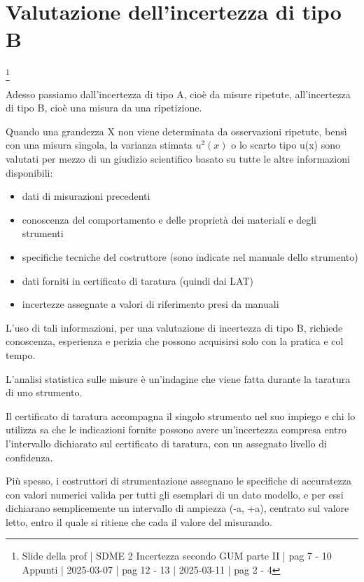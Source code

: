 \newpage

\section{Valutazione dell'incertezza di tipo B}
\footnote{Slide della prof | SDME 2 Incertezza secondo GUM parte II | pag 7 - 10 \\  
Appunti | 2025-03-07 | pag 12 - 13 | 2025-03-11 | pag 2 - 4}

Adesso passiamo dall'incertezza di tipo A, cioè da misure ripetute, 
all'incertezza di tipo B, cioè una misura da una ripetizione. \newline 

Quando una grandezza X non viene determinata da osservazioni ripetute, 
bensì con una misura singola, 
la varianza stimata $u^{2} (x)$ o lo scarto tipo u(x) sono valutati per mezzo 
di un giudizio scientifico basato su tutte le altre informazioni disponibili: 

\begin{itemize}
    \item dati di misurazioni precedenti 
    \item conoscenza del comportamento e delle proprietà dei materiali e degli strumenti 
    \item specifiche tecniche del costruttore (sono indicate nel manuale dello strumento)
    \item dati forniti in certificato di taratura (quindi dai LAT) 
    \item incertezze assegnate a valori di riferimento presi da manuali 
\end{itemize}

L'uso di tali informazioni, per una valutazione di incertezza di tipo B, 
richiede conoscenza, esperienza e perizia che possono acquisirsi solo con la pratica e col tempo. \newline 

L'analisi statistica sulle misure è un'indagine che viene fatta durante la taratura di uno strumento. \newline 

Il certificato di taratura accompagna il singolo strumento nel suo impiego e chi lo utilizza sa che le indicazioni fornite possono avere 
un'incertezza compresa entro l'intervallo dichiarato sul certificato di taratura, 
con un assegnato livello di confidenza. \newline 

Più spesso, i costruttori di strumentazione assegnano le specifiche di accuratezza con valori numerici valida per tutti gli 
esemplari di un dato modello, e per essi dichiarano semplicemente un intervallo di ampiezza (-a, +a), centrato sul valore letto, 
entro il quale si ritiene che cada il valore del misurando. \newline 

